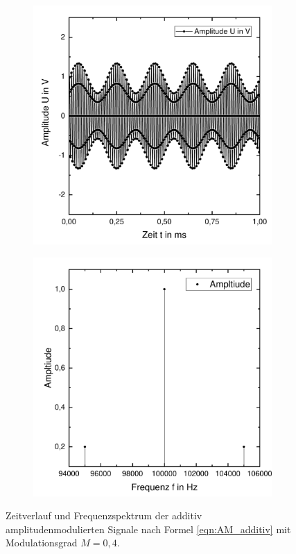 \documentclass[a4paper,twoside,final]{article}
\begin{document}
\begin{figure}[htp]
    \centering
    \begin{subfigure}{0.45\textwidth}
        \includegraphics[width=\textwidth]{Bilder/AM1_additiv_Zeit.pdf}
    \end{subfigure}
    \begin{subfigure}{0.45\textwidth}
        \includegraphics[width=\textwidth]{Bilder/AM1_additiv_Frequenz.pdf}
    \end{subfigure}
    \caption{Zeitverlauf und Frequenzspektrum der additiv amplitudenmodulierten Signale nach Formel \eqref{eqn:AM_additiv} mit Modulationsgrad $M = 0,4$.}
    \label{fig:AM1_additiv}
\end{figure}\\
\end{document}
